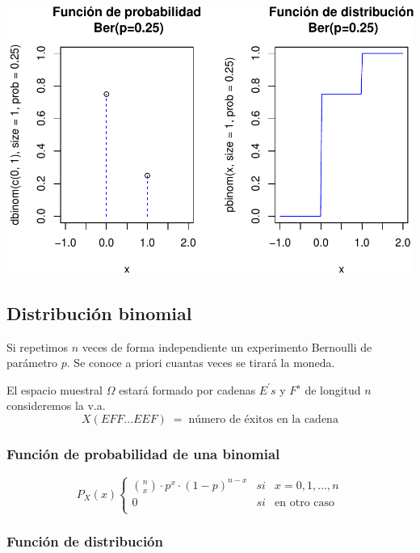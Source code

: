 \documentclass[
]{article}
\begin{document}
\includegraphics{distribuciones_notables_discretas_files/figure-latex/unnamed-chunk-4-1.pdf}

\hypertarget{distribuciuxf3n-binomial}{%
\subsection{Distribución binomial}\label{distribuciuxf3n-binomial}}

Si repetimos \(n\) veces de forma independiente un experimento Bernoulli
de parámetro \(p\). Se conoce a priori cuantas veces se tirará la
moneda.

El espacio muestral \(\Omega\) estará formado por cadenas \(E^{'} s\) y
\(F^{s}\) de longitud \(n\) consideremos la v.a.
\[X(EFF\ldots EEF) \; = \; \mbox{número de éxitos en la cadena}\]

\hypertarget{funciuxf3n-de-probabilidad-de-una-binomial}{%
\subsubsection{Función de probabilidad de una
binomial}\label{funciuxf3n-de-probabilidad-de-una-binomial}}

\[P_X(x)\left\{\begin{array}{rcl}
  {n \choose x}\cdot p^x \cdot (1-p)^{n-x}&si&x=0,1,\ldots,n\\
  0&si&\mbox{en otro caso}\\
\end{array}\right.\]

\hypertarget{funciuxf3n-de-distribuciuxf3n}{%
\subsubsection{Función de
distribución}\label{funciuxf3n-de-distribuciuxf3n}}
\end{document}
